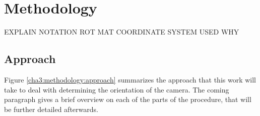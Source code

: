 
\chapter{Methodology}
\label{methodology}

EXPLAIN NOTATION ROT MAT COORDINATE SYSTEM USED WHY

\section{Approach}

Figure \ref{cha3:methodology:approach} summarizes the approach that this work will take to deal with determining the orientation of the camera. The coming paragraph gives a brief overview on each of the parts of the procedure, that will be further detailed afterwards.

